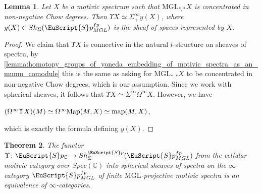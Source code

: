 \documentclass[oneside,a4paper]{amsart}
\newcommand{\euscr}[1]{\EuScript{#1}} %
\newcommand{\map}{\textnormal{map}} %
\newcommand{\Map}{\textnormal{Map}} %
\newcommand{\MGL}{\mathrm{MGL}} %
\newcommand{\spectra}{\euscr{S}p} %
\newcommand{\cspectra}{\euscr{S}p_{\mathbb{C}}} %
\newcommand{\spectramglfp}{\spectra_{MGL}^{fp}} %
\newcommand{\sigmainfty}{\Sigma^{\infty}_{+}} %
\theoremstyle{plain}
\newtheorem{thm}{Theorem}[section]
\newtheorem{lemma}[thm]{Lemma}
\theoremstyle{definition}
\theoremstyle{remark}
\begin{document}
\begin{lemma}
\label{lemma:mgl_chow_connective_motivic_spectrum_a_suspension_of_a_sheaf_of_spaces}
Let $X$ be a motivic spectrum such that $\MGL_{*, *}X$ is concentrated in non-negative Chow degrees. Then $\Upsilon X \simeq \sigmainfty y(X)$, where $y(X) \in Sh_{\Sigma}(\spectramglfp)$ is the sheaf of spaces represented by $X$. 
\end{lemma}

\begin{proof}
We claim that $\Upsilon X$ is connective in the natural $t$-structure on sheaves of spectra, by \cref{lemma:homotopy_groups_of_yoneda_embedding_of_motivic_spectra_as_an_mumu_comodule} this is the same as asking for $\MGL_{*, *} X$ to be concentrated in non-negative Chow degrees, which is our assumption. Since we work with spherical sheaves, it follows that $\Upsilon X \simeq \Sigma^{\infty}_{+} \Omega^{\infty} X$. However, we have 

\begin{center}
$(\Omega^{\infty} \Upsilon X)(M) \simeq \Omega^{\infty} \Map(M, X) \simeq \map(M, X)$,
\end{center}
which is exactly the formula defining $y(X)$.
\end{proof}

\begin{thm}
\label{thm:cellular_motivic_category_as_spherical_sheaves}
The functor $\Upsilon \colon \cspectra \rightarrow Sh_{\Sigma}^{\spectra}(\spectramglfp)$ from the cellular motivic category over $Spec(\mathbb{C})$ into spherical sheaves of spectra on the $\infty$-category $\spectramglfp$ of finite $\MGL$-projective motivic spectra is an equivalence of $\infty$-categories. 
\end{thm}
\end{document}
